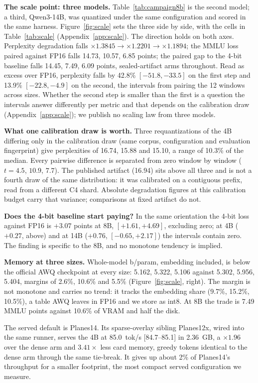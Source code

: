 \textbf{The scale point: three models.} Table~\ref{tab:campaign8b} is the
second model; a third, Qwen3-14B, was quantized under the same configuration
and scored in the same harness. Figure~\ref{fig:scale} sets the three side
by side, with the cells in Table~\ref{tab:scale} (Appendix~\ref{app:scale}).
The direction holds on both axes. Perplexity degradation falls
$\times1.3845 \to \times1.2201 \to \times1.1894$; the MMLU loss paired
against FP16 falls 14.73, 10.57, 6.85 points; the paired gap to the 4-bit
baseline falls 14.45, 7.49, 6.09 points, sealed-artifact arms throughout.
Read as excess over FP16, perplexity falls by 42.8\% $[-51.8, -33.5]$ on the
first step and 13.9\% $[-22.8, -4.9]$ on the second, the intervals from
pairing the 12 windows across sizes. Whether the second step is smaller than
the first is a question the intervals answer differently per metric and that
depends on the calibration draw (Appendix~\ref{app:scale}); we publish no
scaling law from three models.

\textbf{What one calibration draw is worth.} Three requantizations of the
4B differing only in the calibration draw (same corpus, configuration and
evaluation fingerprint) give perplexities of 16.74, 15.88 and 15.10, a range
of 10.3\% of the median. Every pairwise difference is separated from zero
window by window ($t = 4.5$, $10.9$, $7.7$). The published artifact (16.94)
sits above all three and is not a fourth draw of the same distribution: it
was calibrated on a contiguous prefix, read from a different C4 shard.
Absolute degradation figures at this calibration budget carry that variance;
comparisons at fixed artifact do not.

\textbf{Does the 4-bit baseline start paying?} In the same orientation the
4-bit loss against FP16 is $+3.07$ points at 8B, $[+1.61, +4.69]$, excluding
zero; at 4B ($+0.27$, above) and at 14B ($+0.76$, $[-0.65, +2.17]$) the
intervals contain zero. The finding is specific to the 8B, and no monotone
tendency is implied.

\textbf{Memory at three sizes.} Whole-model b/param, embedding included, is
below the official AWQ checkpoint at every size: 5.162, 5.322, 5.106 against
5.302, 5.956, 5.404, margins of 2.6\%, 10.6\% and 5.5\%
(Figure~\ref{fig:scale}, right). The margin is not monotone and carries no
trend: it tracks the embedding share (9.7\%, 15.2\%, 10.5\%), a table AWQ
leaves in FP16 and we store as int8. At 8B the trade is 7.49 MMLU points
against 10.6\% of VRAM and half the disk.

The served default is Planes14. Its sparse-overlay sibling Planes12x, wired
into the same runner, serves the 4B at 85.0~tok/s [84.7--85.1] in 2.36~GB,
a $\times1.96$ over the dense arm and $3.41\times$ less card memory, greedy
tokens identical to the dense arm through the same tie-break. It gives up
about 2\% of Planes14's throughput for a smaller footprint, the most compact
served configuration we measure.

